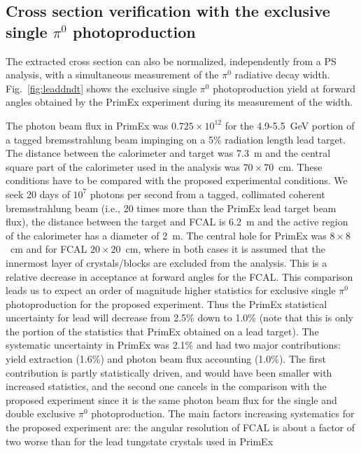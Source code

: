 \subsection{Cross section verification with the exclusive single $\pi^{0}$ photoproduction  \label{sec:pi0norm} }
The extracted cross section can also be normalized, independently
from a PS analysis, with a simultaneous measurement of the $\pi^0$ radiative decay width.  Fig.~\ref{fig:leaddndt} shows the exclusive single $\pi^0$
photoproduction yield at forward angles obtained by the PrimEx
experiment during its measurement of the width.

The photon beam flux in PrimEx was $0.725\times10^{12}$ for
the 4.9-5.5~GeV portion of a tagged bremsstrahlung beam impinging on
a 5\% radiation length lead
target. The distance between the calorimeter and target was 7.3~m
and the central square part of the calorimeter used in the analysis was
$70\times70$~cm. These conditions have to be compared with the
proposed experimental conditions. We seek 20 days of $10^7$ photons per second from a tagged, collimated coherent bremsstrahlung beam
(i.e., 20 times more than the PrimEx lead target beam flux), the
distance between the target and FCAL is 6.2~m and the active region of
the calorimeter has a diameter of 2~m.
The central hole for
PrimEx was $8\times8$~cm and for FCAL $20\times20$~cm, where
in both cases it is assumed that the innermost layer of crystals/blocks
are excluded from the analysis. This is a relative decrease in
acceptance at forward angles for the FCAL.
This comparison leads us to expect an order of
magnitude higher statistics for exclusive single
$\pi^0$ photoproduction for the proposed experiment.
Thus the PrimEx statistical uncertainty for lead will decrease from
2.5\% down to 1.0\% (note that this is only
the portion of the statistics that PrimEx
obtained on a lead target). The systematic uncertainty
in PrimEx was 2.1\% and had two major contributions: yield
extraction (1.6\%) and photon beam flux accounting
(1.0\%).  The first contribution is partly statistically
driven, and would have been smaller with increased statistics,
and the second one cancels in the comparison with the proposed experiment
since it is the same photon beam flux for the single and double exclusive
$\pi^0$ photoproduction. The main factors increasing
systematics for the proposed experiment are: the angular resolution of
FCAL is about a factor of two worse than for
the lead tungstate crystals used in PrimEx
